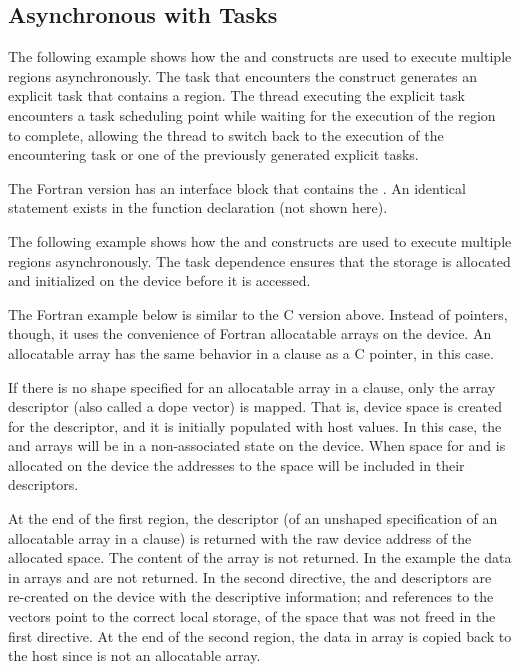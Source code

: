 \subsection{Asynchronous  with Tasks}
\label{subsec:async_target_with_tasks}

The following example shows how the  and  constructs 
are used to execute multiple  regions asynchronously. The task that 
encounters the  construct generates an explicit task that contains 
a  region. The thread executing the explicit task encounters a task 
scheduling point while waiting for the execution of the  region 
to complete, allowing the thread to switch back to the execution of the encountering 
task or one of the previously generated explicit tasks.


The Fortran version has an interface block that contains the  . 
An identical statement exists in the function declaration (not shown here).


The following example shows how the  and  constructs 
are used to execute multiple  regions asynchronously. The task dependence 
ensures that the storage is allocated and initialized on the device before it is 
accessed.


The Fortran example below is similar to the C version above. Instead of pointers, though, it uses
the convenience of Fortran allocatable arrays on the device. An allocatable array has the
same behavior in a  clause as a C pointer, in this case.

If there is no shape specified for an allocatable array in a  clause, only the array descriptor
(also called a dope vector) is mapped. That is, device space is created for the descriptor, and it
is initially populated with host values. In this case, the  and  arrays will be in a
non-associated state on the device. When space for  and  is allocated on the device
the addresses to the space will be included in their descriptors.

At the end of the first  region, the descriptor (of an unshaped specification of an allocatable
array in a  clause) is returned with the raw device address of the allocated space.
The content of the array is not returned. In the example the data in arrays  and 
are not returned. In the second  directive, the  and  descriptors are
re-created on the device with the descriptive information; and references to the
vectors point to the correct local storage, of the space that was not freed in the first 
directive.  At the end of the second  region, the data in array  is copied back
to the host since  is not an allocatable array.

